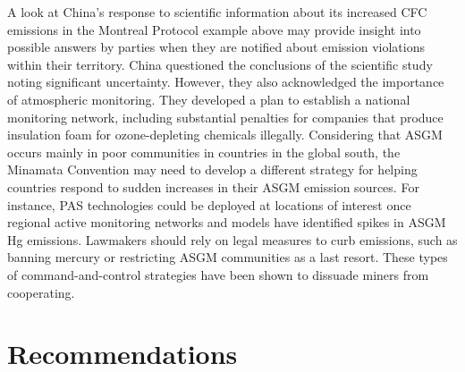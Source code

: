 \begin{flushleft}
A look at China's response to scientific information about its increased CFC emissions in the Montreal Protocol example above may provide insight into possible answers by parties when they are notified about emission violations within their territory. China questioned the conclusions of the scientific study noting significant uncertainty. However, they also acknowledged the importance of atmospheric monitoring. They developed a plan to establish a national monitoring network, including substantial penalties for companies that produce insulation foam for ozone-depleting chemicals illegally. Considering that ASGM occurs mainly in poor communities in countries in the global south, the Minamata Convention may need to develop a different strategy for helping countries respond to sudden increases in their ASGM emission sources. For instance, PAS technologies could be deployed at locations of interest once regional active monitoring networks and models have identified spikes in ASGM Hg emissions. Lawmakers should rely on legal measures to curb emissions, such as banning mercury or restricting ASGM communities as a last resort. These types of command-and-control strategies have been shown to dissuade miners from cooperating.
\end{flushleft}




\section{Recommendations}\label{c4_recommendations}

